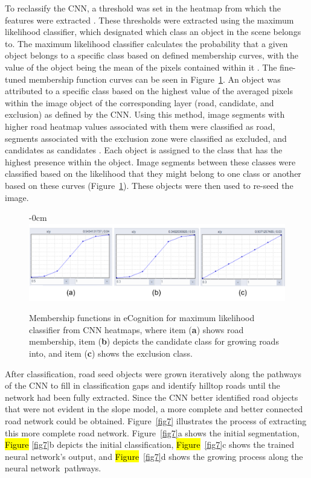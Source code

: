 \documentclass[remotesensing,article,accept,pdftex,moreauthors]{Definitions/mdpi}
\begin{document}
To reclassify the CNN, a threshold was set in the heatmap from which the features were extracted \cite{luca, prakash, timilsina}. These thresholds were extracted using the maximum likelihood classifier, which designated which class an object in the scene belongs to. The maximum likelihood classifier calculates the probability that a given object belongs to a specific class based on defined membership curves, with the value of the object being the mean of the pixels contained within it \cite{richards}. The fine-tuned membership function curves can be seen in Figure~\ref{fig6}. An object was attributed to a specific class based on the highest value of the averaged pixels within the image object of the corresponding layer (road, candidate, and exclusion) as defined by the CNN. Using this method, image segments with higher road heatmap values associated with them were classified as road, segments associated with the exclusion zone were classified as excluded, and candidates as candidates %
. Each object is assigned to the class that has the highest presence within the object. Image segments between these classes were classified based on the likelihood that they might belong to one class or another based on these curves (Figure~\ref{fig6}). These objects were then used to re-seed the image.
\vspace{-6pt}
\begin{figure}[H]
\begin{adjustwidth}{-\extralength}{0cm}
\centering
\includegraphics[width=17cm]{membership.png}
\end{adjustwidth}
\caption{Membership functions in eCognition for maximum likelihood classifier from CNN heatmaps, where item (\textbf{a}) shows road membership, item (\textbf{b}) depicts the candidate class for growing roads into, and item (\textbf{c}) shows the exclusion class. \label{fig6}}
\end{figure}  

After classification, road seed objects were grown iteratively along the pathways of the CNN to fill in classification gaps and identify hilltop roads until the network had been fully extracted. Since the CNN better identified road objects that were not evident in the slope model, a more complete and better connected road network could be obtained. Figure~\ref{fig7} illustrates the process of extracting this more complete road network. Figure~\ref{fig7}a shows the initial segmentation, \hl{Figure} %
\ref{fig7}b depicts the initial classification, \hl{Figure}~\ref{fig7}c shows the trained neural network's output, and \hl{Figure}~\ref{fig7}d shows the growing process along the neural network~pathways. 
\end{document}
